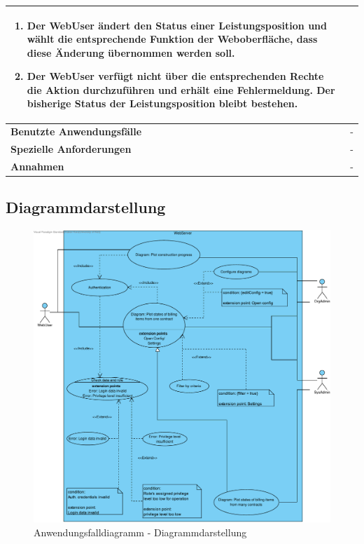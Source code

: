 \begin{longtable}[c]{|p{4cm}|p{10cm}|}
    \begin{enumerate}
        \item Der WebUser \"andert den Status einer Leistungsposition und w\"ahlt die entsprechende Funktion der Weboberfl\"ache,  dass diese \"Anderung \"ubernommen werden soll.
        \item Der WebUser verf\"ugt nicht \"uber die entsprechenden Rechte die Aktion durchzuf\"uhren und erh\"alt eine Fehlermeldung. Der bisherige Status der Leistungsposition bleibt bestehen.
    \end{enumerate}                                                                                                             \\ \hline
    \textbf{Benutzte Anwendungsfälle} & -                                                                         \\ \hline
    \textbf{Spezielle Anforderungen}  & -                                                                                                  \\ \hline
    \textbf{Annahmen}                 & -                                                                                                  \\ \hline
\end{longtable}

\clearpage

\subsection{Diagrammdarstellung}

\begin{figure}[h]
	\centering
	\includegraphics[width=\linewidth]{img/diagrams/Manage_Diagrams.pdf}
	\caption{Anwendungsfalldiagramm - Diagrammdarstellung}
	\label{fig:anwendungsfalldiagramm-dia-verwaltung}
\end{figure}

